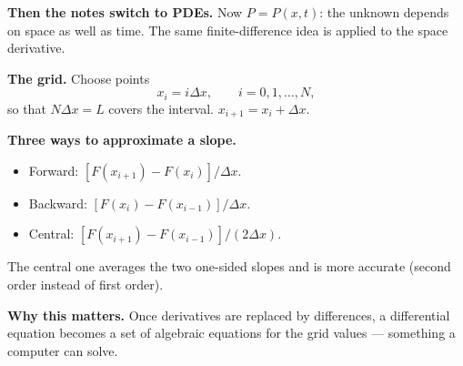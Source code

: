 \documentclass[10pt,a4paper]{article}
\begin{document}
{\textbf{Then the notes switch to PDEs.} Now $P=P(x,t)$: the unknown
depends on space as well as time. The same finite-difference idea is
applied to the space derivative.

\textbf{The grid.} Choose points
\[
x_i=i\Delta x,\qquad i=0,1,\dots,N,
\]
so that $N\Delta x=L$ covers the interval. $x_{i+1}=x_i+\Delta x$.

\textbf{Three ways to approximate a slope.}
\begin{itemize}
\item Forward: $[F(x_{i+1})-F(x_i)]/\Delta x$.
\item Backward: $[F(x_i)-F(x_{i-1})]/\Delta x$.
\item Central: $[F(x_{i+1})-F(x_{i-1})]/(2\Delta x)$.
\end{itemize}
The central one averages the two one-sided slopes and is more accurate
(second order instead of first order).

\textbf{Why this matters.} Once derivatives are replaced by differences,
a differential equation becomes a set of algebraic equations for the
grid values --- something a computer can solve.
}
\end{document}
